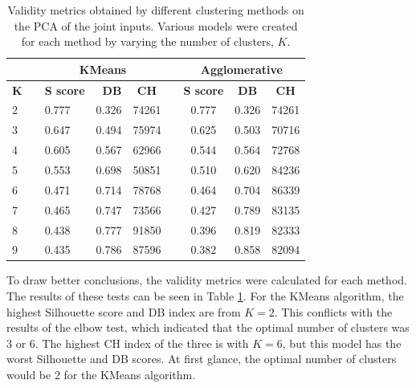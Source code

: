 \begin{table}[h]
 \caption[Validity metrics for PCA of the Joint Inputs]{Validity metrics obtained by different clustering methods on the PCA of the joint inputs. Various models were created for each method by varying the number of clusters, $K$.}\label{tab:pca_joint}
\begin{tabular}{@{}lllrclccc@{}}
\toprule
           &           & \multicolumn{3}{c}{\textbf{KMeans}}          & \textbf{} & \multicolumn{3}{c}{\textbf{Agglomerative}}   \\ \midrule
\textbf{K} & \textbf{} & \textbf{S score} & \textbf{DB} & \textbf{CH} & \textbf{} & \textbf{S score} & \textbf{DB} & \textbf{CH} \\ \midrule
2          &           & 0.777            & 0.326       & 74261       &           & 0.777            & 0.326       & 74261       \\
3          &           & 0.647            & 0.494       & 75974       &           & 0.625            & 0.503       & 70716       \\
4          &           & 0.605            & 0.567       & 62966       &           & 0.544            & 0.564       & 72768       \\
5          &           & 0.553            & 0.698       & 50851       &           & 0.510            & 0.620       & 84236       \\
6          &           & 0.471            & 0.714       & 78768       &           & 0.464            & 0.704       & 86339       \\
7          &           & 0.465            & 0.747       & 73566       &           & 0.427            & 0.789       & 83135       \\
8          &           & 0.438            & 0.777       & 91850       &           & 0.396            & 0.819       & 82333       \\
9          &           & 0.435            & 0.786       & 87596       &           & 0.382            & 0.858       & 82094       \\ \bottomrule
\end{tabular}
\end{table}

To draw better conclusions, the validity metrics were calculated for each method. The results of these tests can be seen in Table \ref{tab:pca_joint}. For the KMeans algorithm, the highest Silhouette score and DB index are from $K=2$. This conflicts with the results of the elbow test, which indicated that the optimal number of clusters was 3 or 6. The highest CH index of the three is with $K=6$, but this model has the worst Silhouette and DB scores. At first glance, the optimal number of clusters would be 2 for the KMeans algorithm.

